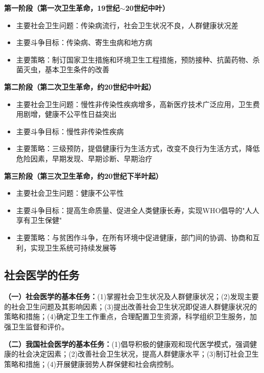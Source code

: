 \begin{keybox}
\textbf{第一阶段（第一次卫生革命，19世纪$\sim$20世纪中叶）}
\begin{itemize}[leftmargin=*]
    \item 主要社会卫生问题：传染病流行，社会卫生状况不良，人群健康状况差
    \item 主要斗争目标：传染病、寄生虫病和地方病
    \item 主要策略：制订国家卫生措施和环境卫生工程措施，预防接种、抗菌药物、杀菌灭虫，基本卫生条件的改善
\end{itemize}

\textbf{第二阶段（第二次卫生革命，约20世纪中叶起）}
\begin{itemize}[leftmargin=*]
    \item 主要社会卫生问题：慢性非传染性疾病增多，高新医疗技术广泛应用，卫生费用剧增，健康不公平性日益突出
    \item 主要斗争目标：慢性非传染性疾病
    \item 主要策略：三级预防，提倡健康行为生活方式，改变不良行为生活方式，降低危险因素，早期发现、早期诊断、早期治疗
\end{itemize}

\textbf{第三阶段（第三次卫生革命，约20世纪下半叶起）}
\begin{itemize}[leftmargin=*]
    \item 主要社会卫生问题：健康不公平性
    \item 主要斗争目标：提高生命质量、促进全人类健康长寿，实现WHO倡导的"人人享有卫生保健"
    \item 主要策略：与贫困作斗争，在所有环境中促进健康，部门间的协调、协商和互利，实现卫生系统可持续发展等
\end{itemize}
\end{keybox}

\subsection{社会医学的任务}

\begin{defbox}
\textbf{（一）社会医学的基本任务：}(1)掌握社会卫生状况及人群健康状况；(2)发现主要的社会卫生问题及其影响因素；(3)提出改善社会卫生状况即促进人群健康状况的策略和措施；(4)确定卫生工作重点，合理配置卫生资源，科学组织卫生服务，加强卫生监督和评价。

\textbf{（二）我国社会医学的基本任务：}(1)倡导积极的健康观和现代医学模式，强调健康的社会决定因素；(2)改善社会卫生状况，提高人群健康水平；(3)制订社会卫生策略和措施；(4)开展健康弱势人群保健和社会病控制。
\end{defbox}

